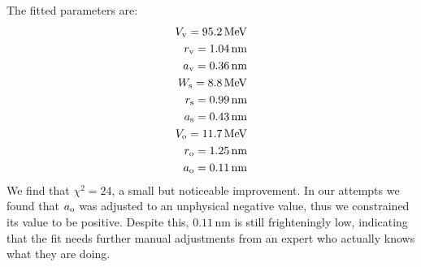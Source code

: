 \documentclass[fleqn, 12pt]{article}
\begin{document}
\begin{enumerate}
  The fitted parameters are:
  \begin{align*}
    V_{\text v} = 95.2\,\mathrm{MeV} \\
    r_{\text v} = 1.04\,\mathrm{nm} \\
    a_{\text v} = 0.36\,\mathrm{nm} \\
    W_{\text s} = 8.8\,\mathrm{MeV} \\
    r_{\text s} = 0.99\,\mathrm{nm} \\
    a_{\text s} = 0.43\,\mathrm{nm} \\
    V_{\text o} = 11.7\,\mathrm{MeV} \\
    r_{\text o} = 1.25\,\mathrm{nm} \\
    a_{\text o} = 0.11\,\mathrm{nm}
  \end{align*}
  We find that $\chi^2 = 24$, a small but noticeable improvement.  In our
  attempts we found that $a_{\text o}$ was adjusted to an unphysical negative
  value, thus we constrained its value to be positive.  Despite this,
  $0.11\,\mathrm{nm}$ is still frighteningly low, indicating that the fit
  needs further manual adjustments from an expert who actually knows what they
  are doing.

\end{enumerate}
\end{document}
